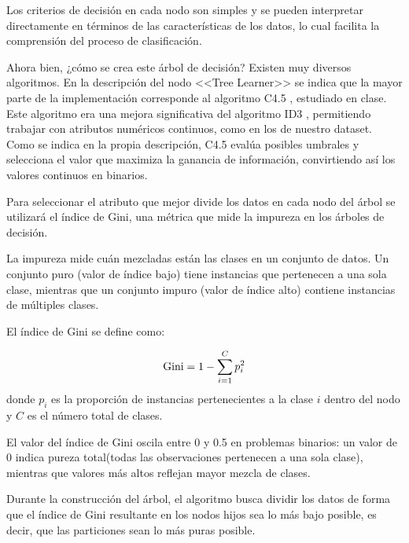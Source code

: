 \begin{enumerate}
    Los criterios de decisión en cada nodo son simples y se pueden interpretar directamente en términos de las características de los datos, lo cual facilita la comprensión del proceso de clasificación.

    Ahora bien, ¿cómo se crea este árbol de decisión? Existen muy diversos algoritmos. En la descripción del nodo <<Tree Learner>> se indica que la mayor parte de la implementación corresponde al algoritmo C4.5 \cite{quinlan1993program}, estudiado en clase. Este algoritmo era una mejora significativa del algoritmo ID3 \cite{quinlan1986induction}, permitiendo trabajar con atributos numéricos continuos, como en los de nuestro dataset. Como se indica en la propia descripción, C4.5 evalúa posibles umbrales y selecciona el valor que maximiza la ganancia de información, convirtiendo así los valores continuos en binarios.

    Para seleccionar el atributo que mejor divide los datos en cada nodo del árbol se utilizará el índice de Gini, una métrica que mide la impureza en los árboles de decisión.

    \begin{tcolorbox}
        [colback=gray!5!white, colframe=gray!60!black, title=Índice de Gini, breakable]
        {\setlength{\parskip}{0.5em plus 0.2em minus 0.1em}

        La impureza mide cuán mezcladas están las clases en un conjunto de datos. Un conjunto puro (valor de índice bajo) tiene instancias que pertenecen a una sola clase, mientras que un conjunto impuro (valor de índice alto) contiene instancias de múltiples clases.

        El índice de Gini se define como:

        $$
        \textnormal{Gini} = 1 - \sum_{i=1}^C p_i^2
        $$
        donde $p_i$ es la proporción de instancias pertenecientes a la clase $i$ dentro del nodo y $C$ es el número total de clases. 

        El valor del índice de Gini oscila entre 0 y 0.5 en problemas binarios: un valor de 0 indica pureza total(todas las observaciones pertenecen a una sola clase), mientras que valores más altos reflejan mayor mezcla de clases.

        Durante la construcción del árbol, el algoritmo busca dividir los datos de forma que el índice de Gini resultante en los nodos hijos sea lo más bajo posible, es decir, que las particiones sean lo más puras posible.
        }
    \end{tcolorbox}


\end{enumerate}
